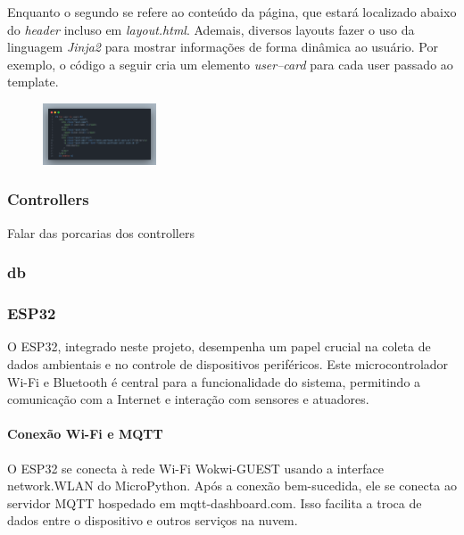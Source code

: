 \documentclass[conference, a4paper, 12pt]{IEEEtran}
\begin{document}
      Enquanto o segundo se refere ao conteúdo da página, que estará localizado abaixo do \emph{header} incluso em \emph{layout.html}. Ademais, diversos layouts fazer o uso da linguagem \emph{Jinja2} para mostrar informações de forma dinâmica ao usuário. Por exemplo, o código a seguir cria um elemento \emph{user--card} para cada user passado ao template.

      \begin{figure}[h]
        \begin{center}
          \includegraphics[width=0.30\textwidth]{user-card.png}
        \end{center}
      \end{figure}



\subsubsection{Controllers}
Falar das porcarias dos controllers
\subsubsection{db}
\subsubsection{ESP32}
O ESP32, integrado neste projeto, desempenha um papel crucial na coleta de dados ambientais e no controle de dispositivos periféricos. Este microcontrolador Wi-Fi e Bluetooth é central para a funcionalidade do sistema, permitindo a comunicação com a Internet e interação com sensores e atuadores.

\paragraph{Conexão Wi-Fi e MQTT}
O ESP32 se conecta à rede Wi-Fi Wokwi-GUEST usando a interface network.WLAN do MicroPython. Após a conexão bem-sucedida, ele se conecta ao servidor MQTT hospedado em mqtt-dashboard.com. Isso facilita a troca de dados entre o dispositivo e outros serviços na nuvem.
\end{document}

